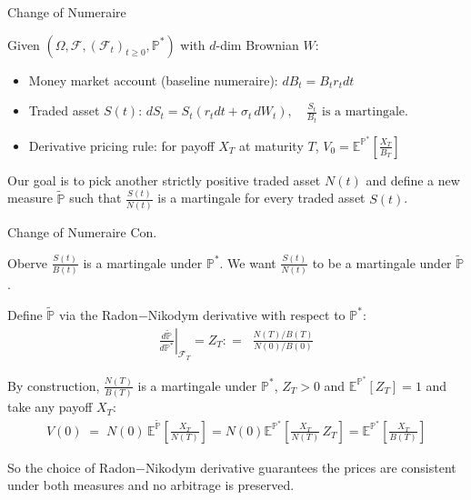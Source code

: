 \documentclass{beamer}
\begin{document}
\begin{frame}{Change of Numeraire}
    \par Given $(\Omega, \mathcal{F}, (\mathcal{F}_t)_{t \geq 0}, \mathbb{P}^*)$ with $d$-dim Brownian $W$:
    \vspace{1em}
    \begin{itemize}
        \item Money market account (baseline numeraire): $ dB_t =  B_t r_t dt$
        \item Traded asset $S(t)$: $dS_t = S_t(r_t dt + \sigma_t\, dW_t),
    \quad \tfrac{S_t}{B_t} \text{ is a martingale.}$
        \item Derivative pricing rule: for payoff $X_T$ at maturity $T$, $V_0 = \mathbb{E}^{\mathbb{P}^*}\left[\frac{X_T}{B_T}\right]$
    \end{itemize}
    \vspace{1em}\pause
    \par Our goal is to pick another strictly positive traded asset $N(t)$ and
  define a new measure $\tilde{\mathbb{P}}$ such that $\frac{S(t)}{N(t)}$ is a martingale for every traded asset $S(t)$.
\end{frame}
\begin{frame}{Change of Numeraire Con.}

    {\footnotesize \footnotesize
    \par Oberve $\displaystyle \frac{S(t)}{B(t)}$ is a martingale under $\mathbb{P}^*$. 
    We want $\displaystyle \frac{S(t)}{N(t)}$ to be a martingale under $\tilde{\mathbb{P}}$.
    \par Define $\tilde{\mathbb{P}}$ via the Radon$-$Nikodym derivative with respect to $\mathbb{P}^*$:
    \begin{align*}
        \left.\frac{d\tilde{\mathbb{P}}}{d\mathbb{P}^*}\right|_{\mathcal{F}_T} = Z_T : = \;\;\frac{N(T)/B(T)}{N(0)/B(0)}
    \end{align*}\pause
    \par By construction, $\frac{N(T)}{B(T)}$ is a martingale under $\mathbb{P}^*$, $Z_T >0$ and $\mathbb{E}^{\mathbb{P}^*}[Z_T]=1$ and take any payoff $X_T$:
    \begin{align*}
         V(0) \;=\; N(0)\,\mathbb{E}^{\tilde{\mathbb{P}}}\!\left[\frac{X_T}{N(T)}\right] 
         =N(0) \mathbb{E}^{\mathbb{P}^*}\!\left[\frac{X_T}{N(T)}\,Z_T\right] = \mathbb{E}^{\mathbb{P}^*}\!\left[\frac{X_T}{B(T)}\right]
    \end{align*}
    \vspace{0.5em}\pause
    \par So the choice of Radon$-$Nikodym derivative guarantees the prices are consistent under both measures and no arbitrage is preserved.
    }
    
\end{frame}
\end{document}
